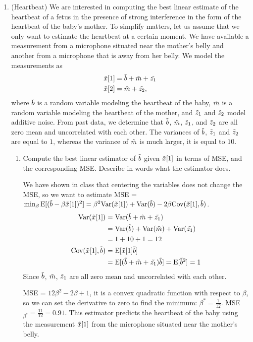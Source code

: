 \documentclass[12pt,twoside]{article}
\begin{document}
\begin{enumerate}
 \item (Heartbeat) We are interested in computing the best linear estimate of the heartbeat of a fetus in the presence of strong interference in the form of the heartbeat of the baby's mother. To simplify matters, let us assume that we only want to estimate the heartbeat at a certain moment. We have available a measurement from a microphone situated near the mother's belly and another from a microphone that is away from her belly. We model the measurements as
\begin{align}
\tilde{  x }[1] & = \tilde{  b } + \tilde{ m } + \tilde{ z_1 }\\
\tilde{  x }[2] & = \tilde{ m } + \tilde{ z_2 },
\end{align}
where $\tilde{  b }$ is a random variable modeling the heartbeat of the baby, $\tilde{ m }$ is a random variable modeling the heartbeat of the mother, and $\tilde{ z }_1$ and $\tilde{ z }_2$ model additive noise. From past data, we determine that $\tilde{  b }$, $\tilde{ m }$, $\tilde{ z }_1$, and $\tilde{ z }_2$ are all zero mean and uncorrelated with each other. The variances of $\tilde{  b }$, $\tilde{ z }_1$ and $\tilde{ z }_2$ are equal to $1$, whereas the variance of $\tilde{ m }$ is much larger, it is equal to $10$.
\begin{enumerate}
\item Compute the best linear estimator of $\tilde{  b }$ given $\tilde{  x }[1]$ in terms of MSE, and the corresponding MSE. Describe in words what the estimator does. 

We have shown in class that centering the variables does not change the MSE, so we want to estimate 
MSE = $\min_\beta \E[(\rb - \beta \rx[1])^2] = \beta^2 \var(\rx[1]) + \var(\rb) -2 \beta \cov(\rx[1], \rb)$.
\begin{align*}
	 \var(\rx[1])		&= 	\var(\rb + \rnd{m} + \rnd{z_1}) \\
	 				&= 	\var(\rb) + \var(\rnd{m} )	+ \var(\rnd{z_1})	\\
					&=	1 + 10 + 1	=12	 \\
	\cov(\rx[1], \rb)		&=	\E[\rx[1] \rb]	\\
					&= 	\E[ (\rb + \rnd{m} + \rnd{z_1}) \rb] = \E[\rb^2] = 1
\end{align*}
Since $\tilde{  b }$, $\tilde{ m }$, $\tilde{ z }_1$ are all zero mean and uncorrelated with each other.

MSE = $12 \beta^2 -2 \beta + 1$, it is a convex quadratic function with respect to $\beta$, so we can set the derivative to zero to find the minimum: $\beta^* = \frac{1}{12}$.
MSE$_{\beta^*} = \frac{11}{12} = 0.91$. This estimator predicts the heartbeat of the baby using the measurement $\tilde{  x }[1]$ from the microphone situated near  the mother's belly.


\end{enumerate}
\end{enumerate}
\end{document}
